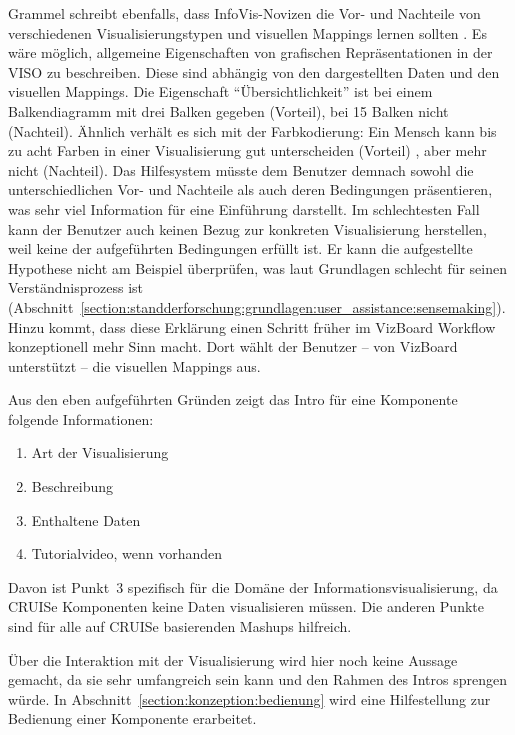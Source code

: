 \documentclass[
	headsepline,
	footsepline,
	fontsize=12pt,
	bibliography=totoc
]{scrbook}
\begin{document}
Grammel schreibt ebenfalls, dass InfoVis-Novizen die Vor- und Nachteile von verschiedenen Visualisierungstypen und visuellen Mappings lernen sollten \cite[S. 125]{Grammel2012}. Es wäre möglich, allgemeine Eigenschaften von grafischen Repräsentationen in der VISO zu beschreiben. Diese sind abhängig von den dargestellten Daten und den visuellen Mappings. Die Eigenschaft \enquote{Übersichtlichkeit} ist bei einem Balkendiagramm mit drei Balken gegeben (Vorteil), bei 15 Balken nicht (Nachteil). Ähnlich verhält es sich mit der Farbkodierung: Ein Mensch kann bis zu acht Farben in einer Visualisierung gut unterscheiden (Vorteil) \cite{Mazza2009}, aber mehr nicht (Nachteil). Das Hilfesystem müsste dem Benutzer demnach sowohl die unterschiedlichen Vor- und Nachteile als auch deren Bedingungen präsentieren, was sehr viel Information für eine Einführung darstellt. Im schlechtesten Fall kann der Benutzer auch keinen Bezug zur konkreten Visualisierung herstellen, weil keine der aufgeführten Bedingungen erfüllt ist. Er kann die aufgestellte Hypothese nicht am Beispiel überprüfen, was laut Grundlagen schlecht für seinen Verständnisprozess ist (Abschnitt~\ref{section:standderforschung:grundlagen:user_assistance:sensemaking}). Hinzu kommt, dass diese Erklärung einen Schritt früher im VizBoard Workflow konzeptionell mehr Sinn macht. Dort wählt der Benutzer -- von VizBoard unterstützt -- die visuellen Mappings aus.

Aus den eben aufgeführten Gründen zeigt das Intro für eine Komponente folgende Informationen:

\begin{enumerate}
	\item Art der Visualisierung
	\item Beschreibung
	\item Enthaltene Daten
	\item Tutorialvideo, wenn vorhanden
\end{enumerate}

Davon ist Punkt~3 spezifisch für die Domäne der Informationsvisualisierung, da CRUISe Komponenten keine Daten visualisieren müssen. Die anderen Punkte sind für alle auf CRUISe basierenden Mashups hilfreich.


Über die Interaktion mit der Visualisierung wird hier noch keine Aussage gemacht, da sie sehr umfangreich sein kann und den Rahmen des Intros sprengen würde. In Abschnitt~\ref{section:konzeption:bedienung} wird eine Hilfestellung zur Bedienung einer Komponente erarbeitet.
\end{document}
